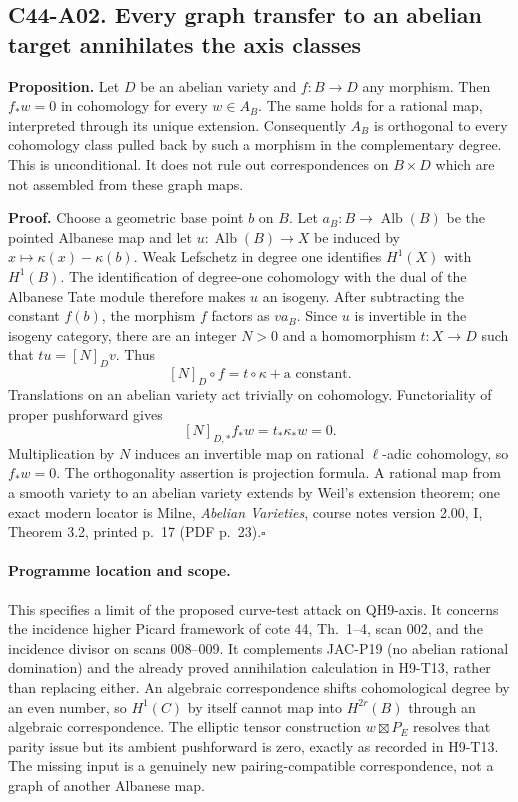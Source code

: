 \subsection*{C44-A02. Every graph transfer to an abelian target annihilates the axis classes}

\textbf{Proposition.}
Let $D$ be an abelian variety and $f:B\longrightarrow D$ any
morphism. Then $f_*w=0$ in cohomology for every $w\in A_B$.
The same holds for a rational map, interpreted through its unique
extension. Consequently $A_B$ is orthogonal to every cohomology
class pulled back by such a morphism in the complementary degree.
This is unconditional. It does not rule out correspondences on
$B\times D$ which are not assembled from these graph maps.

\textbf{Proof.}
Choose a geometric base point $b$ on $B$. Let
$a_B:B\longrightarrow\operatorname{Alb}(B)$ be the pointed Albanese
map and let $u:\operatorname{Alb}(B)\longrightarrow X$ be induced by
$x\mapsto\kappa(x)-\kappa(b)$.
Weak Lefschetz in degree one identifies $H^1(X)$ with $H^1(B)$.
The identification of degree-one cohomology with the dual of the
Albanese Tate module therefore makes $u$ an isogeny.
After subtracting the constant $f(b)$, the morphism $f$ factors as
$v a_B$. Since $u$ is invertible in the isogeny category, there are
an integer $N>0$ and a homomorphism $t:X\longrightarrow D$ such that
$t u=[N]_D v$. Thus
\[
 [N]_D\circ f=t\circ\kappa+\text{a constant}.
\]
Translations on an abelian variety act trivially on cohomology.
Functoriality of proper pushforward gives
\[
 [N]_{D,*}f_*w=t_*\kappa_*w=0.
\]
Multiplication by $N$ induces an invertible map on rational
$\ell$-adic cohomology, so $f_*w=0$. The orthogonality assertion is
projection formula. A rational map from a smooth variety to an
abelian variety extends by Weil's extension theorem; one exact
modern locator is Milne, \emph{Abelian Varieties}, course notes
version 2.00, I, Theorem 3.2, printed p.~17 (PDF p.~23).\hfill$\square$

\paragraph{Programme location and scope.}
This specifies a limit of the proposed curve-test attack on
QH9-axis. It concerns the incidence higher Picard framework of
cote 44, Th.~1--4, scan 002, and the incidence divisor on scans
008--009. It complements JAC-P19 (no abelian rational domination)
and the already proved annihilation calculation in H9-T13, rather
than replacing either. An algebraic correspondence shifts
cohomological degree by an even number, so $H^1(C)$ by itself
cannot map into $H^{2r}(B)$ through an algebraic correspondence.
The elliptic tensor construction $w\boxtimes P_E$ resolves that
parity issue but its ambient pushforward is zero, exactly as
recorded in H9-T13. The missing input is a genuinely new
pairing-compatible correspondence, not a graph of another
Albanese map.

